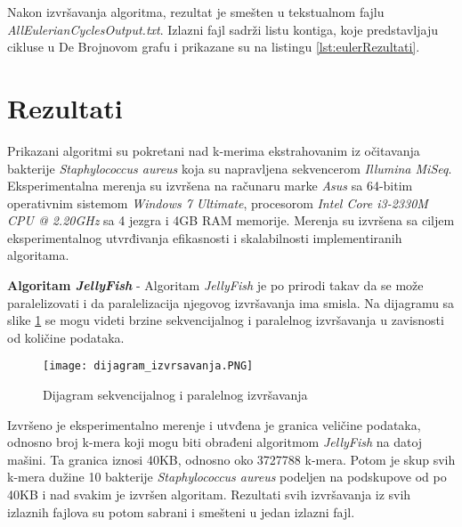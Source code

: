 \documentclass[12pt,oneside]{memoir}
\begin{document}


Nakon izvršavanja algoritma, rezultat je smešten u tekstualnom fajlu \textit{AllEulerianCyclesOutput.txt}. Izlazni fajl sadrži listu kontiga, koje predstavljaju cikluse u De Brojnovom grafu i prikazane su na listingu \ref{lst:eulerRezultati}.



\section{Rezultati}
\label{odeljak:Rezultati}

Prikazani algoritmi su pokretani nad k-merima ekstrahovanim iz očitavanja bakterije \textit{Staphylococcus aureus} koja su napravljena sekvencerom \textit{Illumina MiSeq}. Eksperimentalna merenja su izvršena na računaru marke \textit{Asus} sa 64-bitim operativnim sistemom \textit{Windows 7 Ultimate}, procesorom \textit{Intel Core i3-2330M CPU @ 2.20GHz} sa 4 jezgra i 4GB RAM memorije. Merenja su izvršena sa ciljem eksperimentalnog utvrđivanja efikasnosti i skalabilnosti implementiranih algoritama.

\textbf{Algoritam \textit{JellyFish}} - Algoritam \textit{JellyFish} je po prirodi takav da se može paralelizovati i da paralelizacija njegovog izvršavanja ima smisla. Na dijagramu sa slike \ref{fig:dijagramIzvrsavanja} se mogu videti brzine sekvencijalnog i paralelnog izvršavanja u zavisnosti od količine podataka. 

\begin{figure}[!ht]
  \centering
  \texttt{[image: dijagram\_izvrsavanja.PNG]}
  \caption{Dijagram sekvencijalnog i paralelnog izvršavanja}
  \label{fig:dijagramIzvrsavanja}
\end{figure}

Izvršeno je eksperimentalno merenje i utvđena je granica veličine podataka, odnosno broj k-mera koji mogu biti obrađeni algoritmom \textit{JellyFish} na datoj mašini. Ta granica iznosi 40KB, odnosno oko 3727788 k-mera. Potom je skup svih k-mera dužine 10 bakterije \textit{Staphylococcus aureus} podeljen na podskupove od po 40KB i nad svakim je izvršen algoritam. Rezultati svih izvršavanja iz svih izlaznih fajlova su potom sabrani i smešteni u jedan izlazni fajl.
\end{document}
